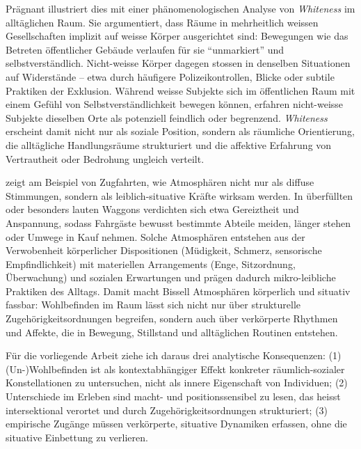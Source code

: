 Prägnant illustriert dies \textcite{ahmedPhenomenologyWhiteness2007} mit einer phänomenologischen Analyse von \emph{Whiteness} im alltäglichen Raum. Sie argumentiert, dass Räume in mehrheitlich weissen Gesellschaften implizit auf weisse Körper ausgerichtet sind: Bewegungen wie das Betreten öffentlicher Gebäude verlaufen für sie \enquote{unmarkiert} und selbstverständlich. Nicht-weisse Körper dagegen stossen in denselben Situationen auf Widerstände -- etwa durch häufigere Polizeikontrollen, Blicke oder subtile Praktiken der Exklusion. Während weisse Subjekte sich im öffentlichen Raum mit einem Gefühl von Selbstverständlichkeit bewegen können, erfahren nicht-weisse Subjekte dieselben Orte als potenziell feindlich oder begrenzend. \emph{Whiteness} erscheint damit nicht nur als soziale Position, sondern als räumliche Orientierung, die alltägliche Handlungsräume strukturiert und die affektive Erfahrung von Vertrautheit oder Bedrohung ungleich verteilt.

\textcite{bissellPassengerMobilitiesAffective2010} zeigt am Beispiel von Zugfahrten, wie Atmosphären nicht nur als diffuse Stimmungen, sondern als leiblich-situative Kräfte wirksam werden. In überfüllten oder besonders lauten Waggons verdichten sich etwa Gereiztheit und Anspannung, sodass Fahrgäste bewusst bestimmte Abteile meiden, länger stehen oder Umwege in Kauf nehmen. Solche Atmosphären entstehen aus der Verwobenheit körperlicher Dispositionen (Müdigkeit, Schmerz, sensorische Empfindlichkeit) mit materiellen Arrangements (Enge, Sitzordnung, Überwachung) und sozialen Erwartungen und prägen dadurch mikro-leibliche Praktiken des Alltags. Damit macht Bissell Atmosphären körperlich und situativ fassbar: Wohlbefinden im Raum lässt sich nicht nur über strukturelle Zugehörigkeitsordnungen begreifen, sondern auch über verkörperte Rhythmen und Affekte, die in Bewegung, Stillstand und alltäglichen Routinen entstehen.

Für die vorliegende Arbeit ziehe ich daraus drei analytische Konsequenzen: (1) (Un\nobreakdash-)Wohl\-be\-find\-en ist als kontextabhängiger Effekt konkreter räumlich-sozialer Konstellationen zu untersuchen, nicht als innere Eigenschaft von Individuen; (2) Unterschiede im Erleben sind macht- und positionssensibel zu lesen, das heisst intersektional verortet und durch Zugehörigkeitsordnungen strukturiert; (3) empirische Zugänge müssen verkörperte, situative Dynamiken erfassen, ohne die situative Einbettung zu verlieren.

\vspace{1em}

